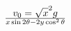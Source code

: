 \documentclass[preview]{standalone}
\begin{document}
\begin{align*}
v_0 = \sqrt  x^2g} \over {x\sin 2\theta -2y\cos ^{2}\theta
\end{align*}
\end{document}
